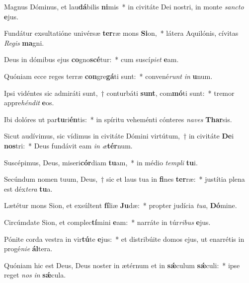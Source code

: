 \item Magnus Dóminus, et lau\textbf{dá}bilis \textbf{ni}mis~* in civitáte Dei nostri, in monte \textit{sanc}\textit{to} \textbf{e}jus.
\item Fundátur exsultatióne univérsæ \textbf{ter}ræ mons \textbf{Si}on,~* látera Aquilónis, cívitas \textit{Re}\textit{gis} \textbf{ma}gni.
\item Deus in dómibus ejus \textbf{co}gno\textbf{scé}tur:~* cum suscí\textit{pi}\textit{et} \textbf{e}am.
\item Quóniam ecce reges terræ \textbf{con}gre\textbf{gá}ti sunt:~* convené\textit{runt} \textit{in} \textbf{u}num.
\item Ipsi vidéntes sic admiráti sunt,~† conturbáti \textbf{sunt}, com\textbf{mó}ti sunt:~* tremor appre\textit{hén}\textit{dit} \textbf{e}os.
\item Ibi dolóres ut par\textbf{tu}ri\textbf{én}tis:~* in spíritu veheménti cónteres \textit{na}\textit{ves} \textbf{Thar}sis.
\item Sicut audívimus, sic vídimus in civitáte Dómini virtútum,~† in civitáte \textbf{De}i \textbf{nos}tri:~* Deus fundávit eam \textit{in} \textit{æ}\textbf{tér}num.
\item Suscépimus, Deus, miseri\textbf{cór}diam \textbf{tu}am,~* in médio \textit{tem}\textit{pli} \textbf{tu}i.
\item Secúndum nomen tuum, Deus,~† sic et laus tua in \textbf{fi}nes \textbf{ter}ræ:~* justítia plena est déx\textit{te}\textit{ra} \textbf{tu}a.
\item Lætétur mons Sion, et exsúltent \textbf{fí}liæ \textbf{Ju}dæ:~* propter judícia \textit{tu}\textit{a}, \textbf{Dó}mine.
\item Circúmdate Sion, et complec\textbf{tí}mini \textbf{e}am:~* narráte in túr\textit{ri}\textit{bus} \textbf{e}jus.
\item Pónite corda vestra in vir\textbf{tú}te \textbf{e}jus:~* et distribúite domos ejus, ut enarrétis in progé\textit{ni}\textit{e} \textbf{ál}tera.
\item Quóniam hic est Deus, Deus noster in ætérnum et in \textbf{sǽ}culum \textbf{sǽ}culi:~* ipse reget \textit{nos} \textit{in} \textbf{sǽ}cula.
